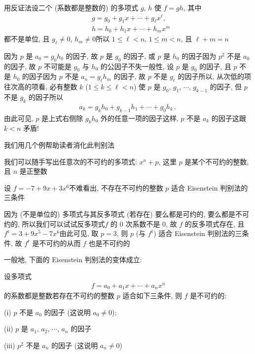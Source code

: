 \begin{pf}
    用反证法\period 设二个 (系数都是整数的) 的多项式 $g$, $h$ 使 $f = gh$, 其中
    \begin{align*}
         & g = g_0 + g_1 x + \cdots + g_\ell x^\ell, \\
         & h = h_0 + h_1 x + \cdots + h_m x^m
    \end{align*}
    都不是单位, 且 $g_\ell \neq 0$, $h_m \neq 0$\period 所以 $1 \leq \ell < n$, $1 \leq m < n$, 且 $\ell + m = n$\period

    因为 $p$ 是 $a_0 = g_0 h_0$ 的因子, 故 $p$ 是 $g_0$ 的因子, 或 $p$ 是 $h_0$ 的因子\period 因为 $p^2$ 不是 $a_0$ 的因子, 故 $p$ 不可能是 $g_0$ 与 $h_0$ 的公因子\period 不失一般性, 设 $p$ 是 $g_0$ 的因子, 且 $p$ 不是 $h_0$ 的因子\period 因为 $p$ 不是 $a_n = g_\ell h_m$ 的因子, 故 $p$ 不是 $g_\ell$ 的因子\period 所以, 从次低的项往次高的项看, 必有整数 $k$ ($1 \leq k \leq \ell < n$) 使 $p$ 是 $g_0$, $g_1$, $\cdots$, $g_{k-1}$ 的因子, 但 $p$ 不是 $g_k$ 的因子\period 所以
    \begin{align*}
        a_k = g_k h_0 + g_{k-1} h_1 + \cdots + g_0 h_k \period
    \end{align*}
    由此可见, $p$ 是上式右侧除 $g_k h_0$ 外的任意一项的因子\period 这样, $p$ 不是 $a_k$ 的因子\period 这跟 $k < n$ 矛盾!
\end{pf}

我们用几个例帮助读者消化此判别法\period

\begin{example}
    我们可以随手写出任意次的不可约的多项式: $x^n + p$, 这里 $p$ 是某个不可约的整数, 且 $n$ 是正整数\period
\end{example}

\begin{example}
    设 $f = -7 + 9x + 3x^6$\period 不难看出, 不存在不可约的整数 $p$ 适合 Eisenstein 判别法的三条件\period

    因为 (不是单位的) 多项式与其反多项式 (若存在) 要么都是可约的, 要么都是不可约的, 所以我们可以试试反多项式\period $f$ 的 $0$ 次系数不是 $0$, 故 $f$ 的反多项式存在, 且 $f^{\mathrm{r}} = 3 + 9x^5 - 7x^6$\period 由此可见, 取 $p = 3$, 则 $p$ (与 $f^{\mathrm{r}}$) 适合 Eisenstein 判别法的三条件, 故 $f^{\mathrm{r}}$ 是不可约的\period 从而 $f$ 也是不可约的\period
\end{example}

一般地, 下面的 Eisenstein 判别法的变体成立:

\begin{proposition}
    设多项式
    \begin{align*}
        f = a_0 + a_1 x + \cdots + a_n x^n
    \end{align*}
    的系数都是整数\period 若存在不可约的整数 $p$ 适合如下三条件, 则 $f$ 是不可约的:

    (i) $p$ 不是 $a_0$ 的因子 (这说明 $a_0 \neq 0$);

    (ii) $p$ 是 $a_1$, $a_2$, $\cdots$, $a_n$ 的因子\period

    (iii) $p^2$ 不是 $a_n$ 的因子 (这说明 $a_n \neq 0$)\period
\end{proposition}

